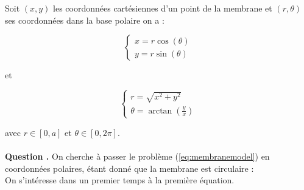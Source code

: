\documentclass[a4,12pt]{article}
\newcounter{Nbquestion}
\newcommand*\question{%
  \stepcounter{Nbquestion}%
  \textbf{Question \theNbquestion. }}
\begin{document}
	      Soit $(x,y)$ les coordonnées cartésiennes d'un point de la membrane et $(r,\theta)$ ses coordonnées dans la base polaire on a :
	      \begin{center}
		\begin{minipage}[l]{.9\linewidth}

		  \begin{minipage}[l]{.4\linewidth}
		    \begin{equation*} 
		      \left\{ 
			\begin{array}{rcl}
			  x=r\cos(\theta) \\
			  y=r\sin(\theta)
			\end{array} 
			\right.
		      \end{equation*}
		    \end{minipage}
		    et
		    \begin{minipage}[r]{.4\linewidth}
		      \begin{equation*} 
			\left\{ 
			  \begin{array}{rcl}
			    r=\sqrt{x^2+y^2} \\
			    \theta=\arctan(\frac{y}{x})
			  \end{array} 
			  \right.
			\end{equation*}
		      \end{minipage}

		    \end{minipage}
		  \end{center}

		  avec $r \in[0,a]$ et $\theta  \in [0,2\pi]$.\\\\


		  \question On cherche à passer le problème (\ref{eq:membranemodel}) en coordonnées polaires, étant donné que la membrane est circulaire :\\

		  On s'intéresse dans un premier temps à la première équation.\\
\end{document}
